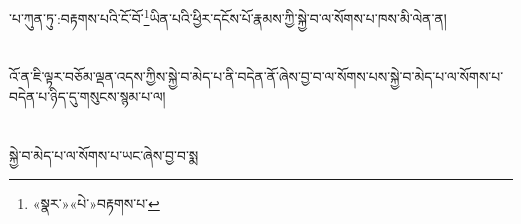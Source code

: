 ་པ་ཀུན་ཏུ་:བརྟགས་པའི་ངོ་བོ་\footnote{«སྣར་»«པེ་»བརྟགས་པ་}ཡིན་པའི་ཕྱིར་དངོས་པོ་རྣམས་ཀྱི་སྐྱེ་བ་ལ་སོགས་པ་ཁས་མི་ལེན་ན།\chapter{ }འོ་ན་ཇི་ལྟར་བཅོམ་ལྡན་འདས་ཀྱིས་སྐྱེ་བ་མེད་པ་ནི་བདེན་ནོ་ཞེས་བྱ་བ་ལ་སོགས་པས་སྐྱེ་བ་མེད་པ་ལ་སོགས་པ་བདེན་པ་ཉིད་དུ་གསུངས་སྙམ་པ་ལ།\chapter{ }སྐྱེ་བ་མེད་པ་ལ་སོགས་པ་ཡང་ཞེས་བྱ་བ་སྨ